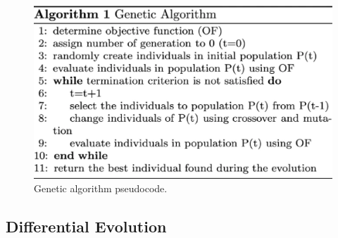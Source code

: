 \documentclass[12pt,a4paper,openany]{book}
\begin{document}
 \begin{figure}[ht!]
     \centering
     \includegraphics[scale=0.4]{figs/gen-algo-pseudo.eps}
     \caption{Genetic algorithm pseudocode.}\label{Fig:PROGAN}
 \end{figure}

% 


\subsection{Differential Evolution}
\end{document}
